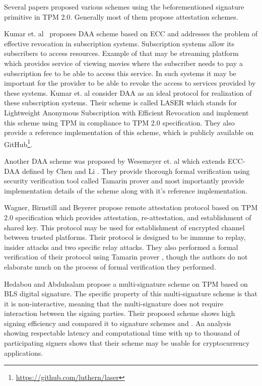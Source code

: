 Several papers proposed various schemes using the beforementioned signature primitive in TPM 2.0. Generally most of them propose attestation schemes. 

Kumar et. al~\cite{kumar2018direct} proposes DAA scheme based on ECC and addresses the problem of effective revocation in subscription systems. Subscription systems allow its subscribers to access resources. Example of that may be streaming platform which provides service of viewing movies where the subscriber needs to pay a subscription fee to be able to access this service. In such systems it may be important for the provider to be able to revoke the access to services provided by these systems. Kumar et. al consider DAA as an ideal protocol for realization of these subscription systems. Their scheme is called LASER which stands for Lightweight Anonymous Subscription with Efficient Revocation and implement this scheme using TPM in compliance to TPM 2.0 specification. They also provide a reference implementation of this scheme, which is publicly available on GitHub\footnote{\url{https://github.com/luthern/laser}}. 

Another DAA scheme was proposed by Wesemeyer et. al \cite{wesemeyerDAA} which extends ECC-DAA defined by Chen and Li \cite{chen2013flexible}. They provide thorough formal verification using security verification tool called Tamarin prover \cite{meier2013tamarin} and most importantly provide implementation details of the scheme along with it's reference implementation.

Wagner, Birnstill and Beyerer \cite{wagnerRemoteAttProtocol} propose remote attestation protocol based on TPM 2.0 specification which provides attestation, re-attestation, and establishment of shared key. This protocol may be used for establishment of encrypted channel between trusted platforms. Their protocol is designed to be immune to replay, insider attacks and two specific relay attacks. They also performed a formal verification of their
protocol using Tamarin prover \cite{meier2013tamarin}, though the authors do not elaborate much on the process of formal verification they performed.

Hedabou and Abdulsalam \cite{hedabou2020efficient} propose a multi-signature scheme on TPM based on BLS digital signature. The specific property of this multi-signature scheme is that it is non-interactive, meaning that the multi-signature does not require interaction between the signing parties. Their proposed scheme shows high signing efficiency and compared it to signature schemes \cite{chen2013flexible} and \cite{schnorrSpec}. An analysis showing respectable latency and computational time with up to thousand of participating signers shows that their scheme may be usable for cryptocurrency applications.





